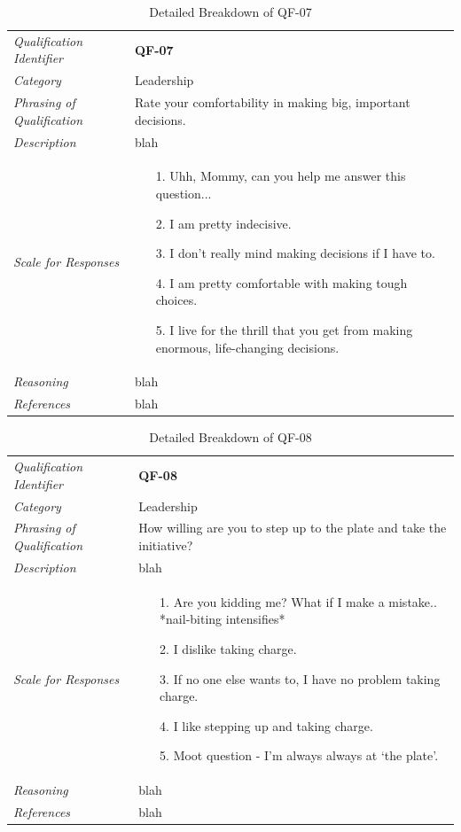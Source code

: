 \documentclass[12pt,letterpaper]{article}
\begin{document}
\begin{table}[H]
	\caption{Detailed Breakdown of QF-07}
	\begin{tabu} to 
		\toprule
		Qualification Identifier & {\bf QF-07}\\
		Category & Leadership \\
		Phrasing of Qualification & Rate your comfortability in making big, important decisions. \\
		Description & blah\\
		Scale for Responses &
		\begin{minipage}[t]{\linewidth}
			\begin{enumerate}
				\item[1.] Uhh, Mommy, can you help me answer this question...
				\item[2.] I am pretty indecisive.
				\item[3.] I don't really mind making decisions if I have to.
				\item[4.] I am pretty comfortable with making tough choices.
				\item[5.] I live for the thrill that you get from making enormous, life-changing decisions.
			\end{enumerate}
		\end{minipage}\\
		Reasoning & blah\\
		References & blah\\
		\toprule
	\end{tabu}
\end{table}

\begin{table}[H]
	\caption{Detailed Breakdown of QF-08}
	\begin{tabu} to 
		\toprule
		Qualification Identifier & {\bf QF-08}\\
		Category & Leadership \\
		Phrasing of Qualification & How willing are you to step up to the plate and take the initiative?\\
		Description & blah\\
		Scale for Responses &
		\begin{minipage}[t]{\linewidth}
			\begin{enumerate}
				\item[1.] Are you kidding me? What if I make a mistake.. *nail-biting intensifies*
				\item[2.] I dislike taking charge.
				\item[3.] If no one else wants to, I have no problem taking charge.
				\item[4.] I like stepping up and taking charge.
				\item[5.] Moot question - I'm always always at `the plate'.
			\end{enumerate}
		\end{minipage}\\
		Reasoning & blah\\
		References & blah\\
		\toprule
	\end{tabu}
\end{table}
\end{document}
